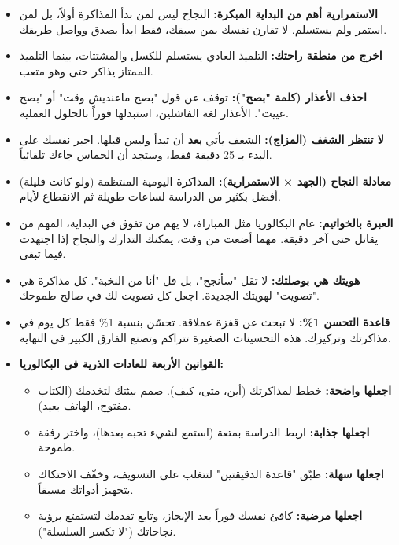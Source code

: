 \documentclass[12pt,a4paper]{book}
\begin{document}
	\begin{itemize}
		\item \textbf{الاستمرارية أهم من البداية المبكرة:} النجاح ليس لمن بدأ المذاكرة أولاً، بل لمن استمر ولم يستسلم. لا تقارن نفسك بمن سبقك، فقط ابدأ بصدق وواصل طريقك.
		
		\item \textbf{اخرج من منطقة راحتك:} التلميذ العادي يستسلم للكسل والمشتتات، بينما التلميذ الممتاز يذاكر حتى وهو متعب.
	
		
		\item \textbf{احذف الأعذار (كلمة "بصح"):} توقف عن قول "بصح ماعنديش وقت" أو "بصح عييت". الأعذار لغة الفاشلين، استبدلها فوراً بالحلول العملية.
		
		\item \textbf{لا تنتظر الشغف (المزاج):} الشغف يأتي \textbf{بعد} أن تبدأ وليس قبلها. اجبر نفسك على البدء بـ 25 دقيقة فقط، وستجد أن الحماس جاءك تلقائياً.
		
		\item \textbf{معادلة النجاح (الجهد × الاستمرارية):} المذاكرة اليومية المنتظمة (ولو كانت قليلة) أفضل بكثير من الدراسة لساعات طويلة ثم الانقطاع لأيام.
		
		\item \textbf{العبرة بالخواتيم:} عام البكالوريا مثل المباراة، لا يهم من تفوق في البداية، المهم من يقاتل حتى آخر دقيقة. مهما أضعت من وقت، يمكنك التدارك والنجاح إذا اجتهدت فيما تبقى.
		
		\item \textbf{هويتك هي بوصلتك:} لا تقل "سأنجح"، بل قل "أنا من النخبة". كل مذاكرة هي "تصويت" لهويتك الجديدة. اجعل كل تصويت لك في صالح طموحك.
		
		\item \textbf{قاعدة التحسن 1\%:} لا تبحث عن قفزة عملاقة. تحسّن بنسبة 1\% فقط كل يوم في مذاكرتك وتركيزك. هذه التحسينات الصغيرة تتراكم وتصنع الفارق الكبير في النهاية.
		
		\item \textbf{القوانين الأربعة للعادات الذرية في البكالوريا:}
		\begin{itemize}
			\item \textbf{اجعلها واضحة:} خطط لمذاكرتك (أين، متى، كيف). صمم بيئتك لتخدمك (الكتاب مفتوح، الهاتف بعيد).
			\item \textbf{اجعلها جذابة:} اربط الدراسة بمتعة (استمع لشيء تحبه بعدها)، واختر رفقة طموحة.
			\item \textbf{اجعلها سهلة:} طبّق "قاعدة الدقيقتين" لتتغلب على التسويف، وخفّف الاحتكاك بتجهيز أدواتك مسبقاً.
			\item \textbf{اجعلها مرضية:} كافئ نفسك فوراً بعد الإنجاز، وتابع تقدمك لتستمتع برؤية نجاحاتك ("لا تكسر السلسلة").
		\end{itemize}
		

\end{itemize}
\end{document}
